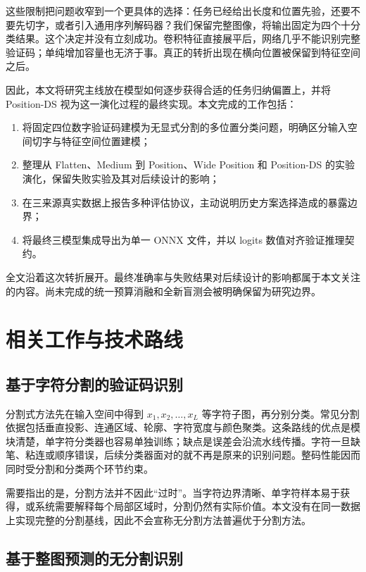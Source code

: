 \documentclass[UTF8,12pt,a4paper]{ctexart}
\begin{document}
这些限制把问题收窄到一个更具体的选择：任务已经给出长度和位置先验，还要不要先切字，或者引入通用序列解码器？我们保留完整图像，将输出固定为四个十分类结果。这个决定并没有立刻成功。卷积特征直接展平后，网络几乎不能识别完整验证码；单纯增加容量也无济于事。真正的转折出现在横向位置被保留到特征空间之后。

因此，本文将研究主线放在模型如何逐步获得合适的任务归纳偏置上，并将 Position-DS 视为这一演化过程的最终实现。本文完成的工作包括：

\begin{enumerate}
  \item 将固定四位数字验证码建模为无显式分割的多位置分类问题，明确区分输入空间切字与特征空间位置建模；
  \item 整理从 Flatten、Medium 到 Position、Wide Position 和 Position-DS 的实验演化，保留失败实验及其对后续设计的影响；
  \item 在三来源真实数据上报告多种评估协议，主动说明历史方案选择造成的暴露边界；
  \item 将最终三模型集成导出为单一 ONNX 文件，并以 logits 数值对齐验证推理契约。
\end{enumerate}

全文沿着这次转折展开。最终准确率与失败结果对后续设计的影响都属于本文关注的内容。尚未完成的统一预算消融和全新盲测会被明确保留为研究边界。

\section{相关工作与技术路线}

\subsection{基于字符分割的验证码识别}

分割式方法先在输入空间中得到 $x_1,x_2,\ldots,x_L$ 等字符子图，再分别分类。常见分割依据包括垂直投影、连通区域、轮廓、字符宽度与颜色聚类\cite{chen2017survey}。这条路线的优点是模块清楚，单字符分类器也容易单独训练；缺点是误差会沿流水线传播。字符一旦缺笔、粘连或顺序错误，后续分类器面对的就不再是原来的识别问题。整码性能因而同时受分割和分类两个环节约束。

需要指出的是，分割方法并不因此“过时”。当字符边界清晰、单字符样本易于获得，或系统需要解释每个局部区域时，分割仍然有实际价值。本文没有在同一数据上实现完整的分割基线，因此不会宣称无分割方法普遍优于分割方法。

\subsection{基于整图预测的无分割识别}
\end{document}
